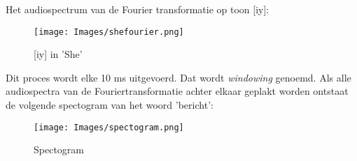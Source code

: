 {\noindent Het audiospectrum van de Fourier transformatie op toon [iy]:\\
\begin{figure}[h]
    \centering
    \texttt{[image: Images/shefourier.png]}
    \caption{[iy] in 'She'}
    \label{fig:fouriertrans}
\end{figure}

\noindent Dit proces wordt elke 10 ms uitgevoerd. Dat wordt \textit{windowing} genoemd. Als alle audiospectra van de Fouriertransformatie achter elkaar geplakt worden ontstaat de volgende spectogram van het woord 'bericht':
\begin{figure}[h!]
    \centering
    \texttt{[image: Images/spectogram.png]}
    \caption{Spectogram}
    \label{fig:fouriertrans}
\end{figure}




}
